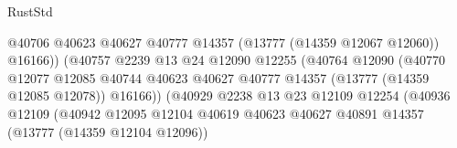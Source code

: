 \begin{lexlean}{RustStd}
\begin{coremodule}
                                                      @40706
                                                      @40623
                                                      @40627
                                                      @40777
                                                      @14357
                                                      (@13777 (@14359 @12067 @12060))
                                                      @16166))
                                                  (@40757
                                                    @2239
                                                    @13
                                                    @24
                                                    @12090
                                                    @12255
                                                    (@40764
                                                      @12090
                                                      (@40770
                                                        @12077
                                                        @12085
                                                        @40744
                                                        @40623
                                                        @40627
                                                        @40777
                                                        @14357
                                                        (@13777 (@14359 @12085 @12078))
                                                        @16166))
                                                    (@40929
                                                      @2238
                                                      @13
                                                      @23
                                                      @12109
                                                      @12254
                                                      (@40936
                                                        @12109
                                                        (@40942
                                                          @12095
                                                          @12104
                                                          @40619
                                                          @40623
                                                          @40627
                                                          @40891
                                                          @14357
                                                          (@13777 (@14359 @12104 @12096))

\end{coremodule}
\end{lexlean}
